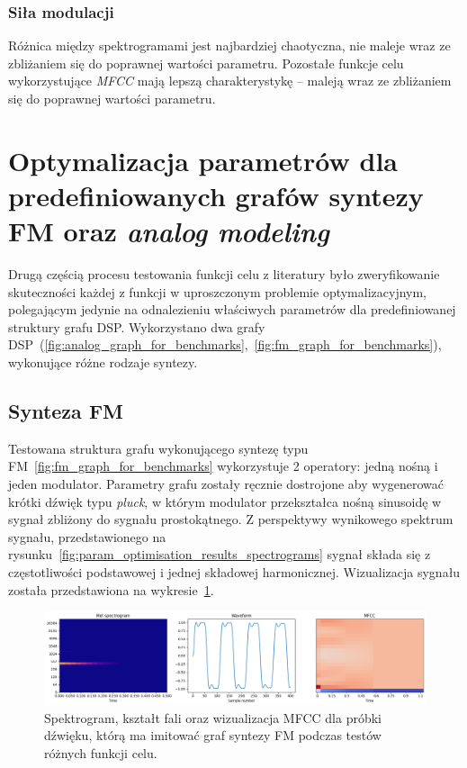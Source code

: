 \subsubsection{Siła modulacji}

Różnica między spektrogramami jest najbardziej chaotyczna, nie maleje wraz
ze zbliżaniem się do poprawnej wartości parametru. Pozostałe funkcje celu
wykorzystujące \textit{MFCC} mają lepszą charakterystykę -- maleją
wraz ze zbliżaniem się do poprawnej wartości parametru.

\section{Optymalizacja parametrów dla predefiniowanych
grafów syntezy FM oraz \textit{analog modeling}}

Drugą częścią procesu testowania funkcji celu z literatury było zweryfikowanie skuteczności
każdej z funkcji w uproszczonym problemie optymalizacyjnym, polegającym jedynie na odnalezieniu właściwych
parametrów dla predefiniowanej struktury grafu DSP\@. Wykorzystano dwa grafy
DSP~(\ref{fig:analog_graph_for_benchmarks},~\ref{fig:fm_graph_for_benchmarks}),
wykonujące różne rodzaje syntezy.


\subsection{Synteza FM}

Testowana struktura grafu wykonującego syntezę typu FM~\ref{fig:fm_graph_for_benchmarks}
wykorzystuje 2 operatory: jedną nośną
i jeden modulator. Parametry grafu zostały ręcznie dostrojone aby wygenerować krótki
dźwięk typu \textit{pluck}, w którym modulator przekształca nośną sinusoidę w sygnał zbliżony
do sygnału prostokątnego. Z perspektywy wynikowego spektrum sygnału, przedstawionego na
rysunku~\ref{fig:param_optimisation_results_spectrograms} sygnał składa się z częstotliwości
podstawowej i jednej składowej harmonicznej. Wizualizacja sygnału została przedstawiona
na wykresie~\ref{fig:fm_training_sample_overview}.

\begin{figure}[H]
    \centering
    \includegraphics[width=1.0\linewidth]{rys03/fm_training_sample_overview.png}
    \caption{
      Spektrogram, kształt fali oraz wizualizacja MFCC dla próbki dźwięku, którą
      ma imitować graf syntezy FM podczas testów różnych funkcji celu.
    }\label{fig:fm_training_sample_overview}
\end{figure}


